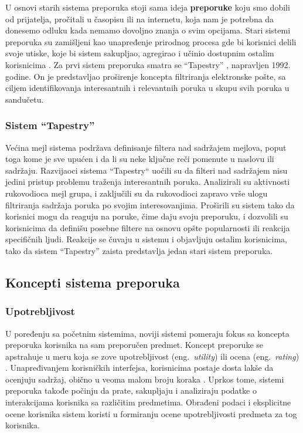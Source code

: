 \documentclass[a4paper]{article}
\begin{document}
U osnovi starih sistema preporuka stoji sama ideja \textbf{preporuke} koju smo dobili od prijatelja, pročitali u časopisu ili na internetu, koja nam je potrebna da donesemo odluku kada nemamo dovoljno znanja o svim opcijama. Stari sistemi preporuka su zamišljeni kao unapređenje prirodnog procesa gde bi korisnici delili svoje utiske, koje bi sistem sakupljao, agregirao i učinio dostupnim ostalim korisnicima \cite{resnick_recommender_1997}. Za prvi sistem preporuka smatra se ``Tapestry'' \cite{goldberg_using_1992}, napravljen 1992. godine. On je predstavljao proširenje koncepta filtriranja elektronske pošte, sa ciljem identifikovanja interesantnih i relevantnih poruka u skupu svih poruka u sandučetu.

\subsubsection{Sistem ``Tapestry''}
\label{subsubsec:tapestry}

Većina mejl sistema podržava definisanje filtera nad sadržajem mejlova, poput toga kome je sve upućen i da li su neke ključne reči pomenute u naslovu ili sadržaju. Razvijaoci sistema ``Tapestry`` uočili su da filteri nad sadržajem nisu jedini pristup problemu traženja interesantnih poruka. Analizirali su aktivnosti rukovodioca mejl grupa, i zaključili su da rukovodioci zapravo vrše ulogu filtriranja sadržaja poruka po svojim interesovanjima. Proširili su sistem tako da korisnici mogu da reaguju na poruke, čime daju svoju preporuku, i dozvolili su korisnicima da definišu posebne filtere na osnovu opšte popularnosti ili reakcija specifičnih ljudi. Reakcije se čuvaju u sistemu i objavljuju ostalim korisnicima, tako da sistem ``Tapestry'' zaista predstavlja jedan stari sistem preporuka.

\subsection{Koncepti sistema preporuka}
\label{subsec:koncepti_sistema_preporuka}

\subsubsection{Upotrebljivost}
\label{subsubsec:upotrebljivost}

U poređenju sa početnim sistemima, noviji sistemi pomeraju fokus sa koncepta preporuka korisnika na sam preporučen predmet. Koncept preporuke se apstrahuje u meru koja se zove upotrebljivost (eng.~{\em utility}) ili ocena (eng.~{\em rating}) \cite{burke_recommender_2011}. Unapređivanjem korisničkih interfejsa, korisnicima postaje dosta lakše da ocenjuju sadržaj, obično u veoma malom broju koraka \cite{aggarwal_recommender_2016}. Uprkos tome, sistemi preporuka takođe počinju da prate, sakupljaju i analiziraju podatke o interakcijama korisnika sa različitim predmetima. Obrađeni podaci i eksplicitne ocene korisnika sistem koristi u formiranju ocene upotrebljivosti predmeta za tog korisnika.
\end{document}
